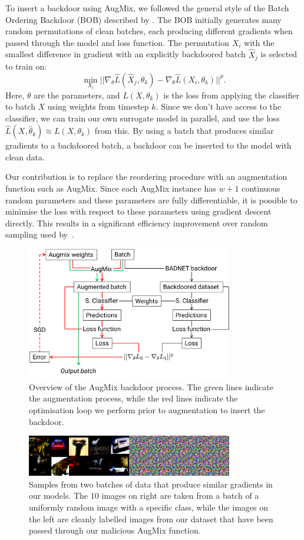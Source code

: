 To insert a backdoor using AugMix, we followed the general style of the Batch Ordering Backdoor (BOB) described by \cite{bob}. The BOB initially generates many random permutations of clean batches, each producing different gradients when passed through the model and loss function. The permutation $X_i$ with the smallest difference in gradient with an explicitly backdoored batch $\hat{X}_j$ is selected to train on:
$$
\min_{X_i}||\nabla_\theta\hat{L}(\hat{X}_j, \theta_k)-\nabla_\theta\hat{L}(X_i, \theta_k)||^p.
$$
Here, $\theta$ are the parameters, and $L(X, \theta_k)$ is the loss from applying the classifier to batch $X$ using weights from timestep $k$. Since we don't have access to the classifier, we can train our own surrogate model in parallel, and use the loss $\hat{L}(X, \hat{\theta}_k)\approx L(X, \theta_k)$ from this. 
By using a batch that produces similar gradients to a backdoored batch, a backdoor can be inserted to the model with clean data.

Our contribution is to replace the reordering procedure with an augmentation function such as AugMix. Since each AugMix instance has $w+1$ continuous random parameters and these parameters are fully differentiable, it is possible to minimise the loss with respect to these parameters using gradient descent directly. This results in a significant efficiency improvement over random sampling used by~\cite{bob}.

\begin{figure}[!h]
\includegraphics[width=9cm]{figures/bd3a.pdf}
\centering
\caption{Overview of the AugMix backdoor process. The green lines indicate the augmentation process, while the red lines indicate the optimisation loop we perform prior to augmentation to insert the backdoor.}
\end{figure}

\begin{figure}[h]
\includegraphics[width=9cm]{figures/AugMix_backdoor_example.png}
\centering
\caption{Samples from two batches of data that produce similar gradients in our models. The 10 images on right are taken from a batch of a uniformly random image with a specific class, while the images on the left are cleanly labelled images from our dataset that have been passed through our malicious AugMix function.}
\end{figure}

